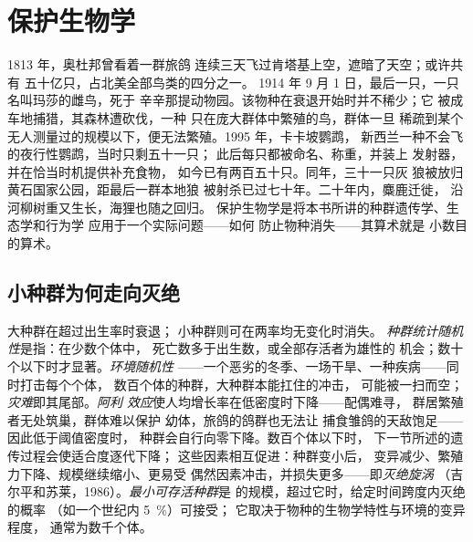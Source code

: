 \chapter{保护生物学}\label{ch:b3:conservation-biology}

1813 年，奥杜邦曾看着一群旅鸽
连续三天飞过肯塔基上空，遮暗了天空；或许共有
五十亿只，占北美全部鸟类的四分之一。
1914 年 9 月 1 日，最后一只，一只名叫玛莎的雌鸟，死于
辛辛那提动物园。该物种在衰退开始时并不稀少；它
被成车地捕猎，其森林遭砍伐，一种
只在庞大群体中繁殖的鸟，群体一旦
稀疏到某个无人测量过的规模以下，便无法繁殖。1995 年，卡卡坡鹦鹉，
新西兰一种不会飞的夜行性鹦鹉，当时只剩五十一只；
此后每只都被命名、称重，并装上
发射器，并在恰当时机提供补充食物，
如今已有两百五十只。同年，三十一只灰
狼被放归黄石国家公园，距最后一群本地狼
被射杀已过七十年。二十年内，麋鹿迁徙，
沿河柳树重又生长，海狸也随之回归。
保护生物学是将本书所讲的种群遗传学、生态学和行为学
应用于一个实际问题——如何
防止物种消失——其算术就是
小数目的算术。

\section{小种群为何走向灭绝}

\begin{definition}[小种群的风险]\label{def:b3:conservation-biology:small}
大种群在超过出生率时衰退；
小种群则可在两率均无变化时消失。
\emph{种群统计随机性}是指：在少数个体中，
死亡数多于出生数，或全部存活者为雄性的
机会；数十个以下时才显著。\emph{环境随机性}
——一个恶劣的冬季、一场干旱、一种疾病——同时打击每个个体，
数百个体的种群，大种群本能扛住的冲击，
可能被一扫而空；\emph{灾难}即其尾部。\emph{阿利
效应}使人均增长率在低密度时下降——配偶难寻，
群居繁殖者无处筑巢，群体难以保护
幼体，旅鸽的鸽群也无法让
捕食雏鸽的天敌饱足——因此低于阈值密度时，
种群会自行向零下降。数百个体以下时，
下一节所述的遗传过程会使适合度逐代下降；
这些因素相互促进：种群变小后，
变异减少、繁殖力下降、规模继续缩小、更易受
偶然因素冲击，并损失更多——即\emph{灭绝旋涡}
（吉尔平和苏莱，1986）。\emph{最小可存活种群}是
的规模，超过它时，给定时间跨度内灭绝的概率
（如一个世纪内 \qty{5}{\%}）可接受；
它取决于物种的生物学特性与环境的变异程度，
通常为数千个体。
\end{definition}

